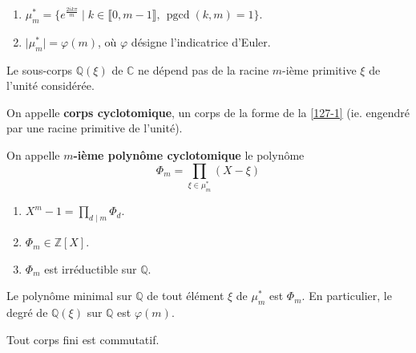 	\begin{proposition}
		\begin{enumerate}[label=(\roman*)]
			\item $\mu_m^* = \{ e^{\frac{2ik\pi}{m}} \mid k \in \llbracket 0, m-1 \rrbracket, \, \operatorname{pgcd}(k, m) = 1 \}$.
			\item $\vert \mu_m^* \vert = \varphi(m)$, où $\varphi$ désigne l'indicatrice d'Euler.
		\end{enumerate}
	\end{proposition}

	\begin{proposition}
		\label{127-1}
		Le sous-corps $\mathbb{Q}(\xi)$ de $\mathbb{C}$ ne dépend pas de la racine $m$-ième primitive $\xi$ de l'unité considérée.
	\end{proposition}

	\begin{definition}
		On appelle \textbf{corps cyclotomique}, un corps de la forme de la \cref{127-1} (ie. engendré par une racine primitive de l'unité).
	\end{definition}

	\begin{definition}
		On appelle \textbf{$m$-ième polynôme cyclotomique} le polynôme
		\[ \Phi_m = \prod_{\xi \in \mu_m^*} (X - \xi) \]
	\end{definition}

	\begin{theorem}
		\begin{enumerate}[label=(\roman*)]
			\item $X^m - 1 = \prod_{d \mid m} \Phi_d$.
			\item $\Phi_m \in \mathbb{Z}[X]$.
			\item $\Phi_m$ est irréductible sur $\mathbb{Q}$.
		\end{enumerate}
	\end{theorem}

	\begin{corollary}
		Le polynôme minimal sur $\mathbb{Q}$ de tout élément $\xi$ de $\mu_m^*$ est $\Phi_m$. En particulier, le degré de $\mathbb{Q}(\xi)$ sur $\mathbb{Q}$ est $\varphi(m)$.
	\end{corollary}

	\begin{application}
		Tout corps fini est commutatif.
	\end{application}


